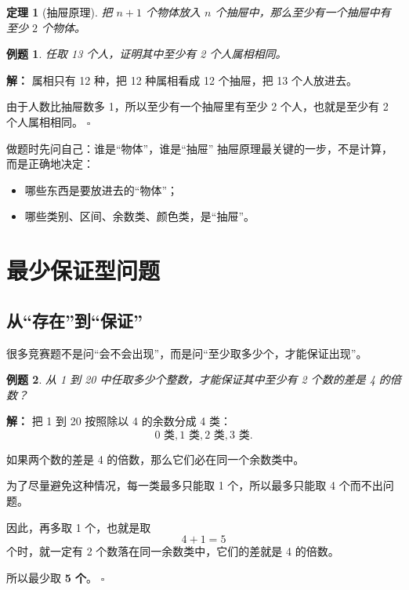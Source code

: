 \documentclass[11pt,a4paper,fontset=fandol]{ctexart}
\theoremstyle{formaltheorem}
\newtheorem{theorem}{定理}[section]
\theoremstyle{formalexample}
\newtheorem{example}{例题}[section]
\newenvironment{solution}{\par\noindent\textbf{解：}}{\hfill$\square$\par}
\begin{document}
\begin{theorem}[抽屉原理]
把 $n+1$ 个物体放入 $n$ 个抽屉中，那么至少有一个抽屉中有至少 $2$ 个物体。
\end{theorem}

\begin{example}
任取 13 个人，证明其中至少有 2 个人属相相同。
\end{example}

\begin{solution}
属相只有 12 种，把 12 种属相看成 12 个抽屉，把 13 个人放进去。

由于人数比抽屉数多 1，所以至少有一个抽屉里有至少 2 个人，也就是至少有 2 个人属相相同。
\end{solution}

\begin{skillbox}{做题时先问自己：谁是“物体”，谁是“抽屉”}
抽屉原理最关键的一步，不是计算，而是正确地决定：
\begin{itemize}
  \item 哪些东西是要放进去的“物体”；
  \item 哪些类别、区间、余数类、颜色类，是“抽屉”。
\end{itemize}
\end{skillbox}

\section{最少保证型问题}

\subsection{从“存在”到“保证”}
很多竞赛题不是问“会不会出现”，而是问“至少取多少个，才能保证出现”。

\begin{example}
从 1 到 20 中任取多少个整数，才能保证其中至少有 2 个数的差是 4 的倍数？
\end{example}

\begin{solution}
把 1 到 20 按照除以 4 的余数分成 4 类：
\[
0\text{ 类},1\text{ 类},2\text{ 类},3\text{ 类}.
\]

如果两个数的差是 4 的倍数，那么它们必在同一个余数类中。

为了尽量避免这种情况，每一类最多只能取 1 个，所以最多只能取 4 个而不出问题。

因此，再多取 1 个，也就是取
\[
4+1=5
\]
个时，就一定有 2 个数落在同一余数类中，它们的差就是 4 的倍数。

所以最少取 \textbf{5 个}。
\end{solution}
\end{document}
